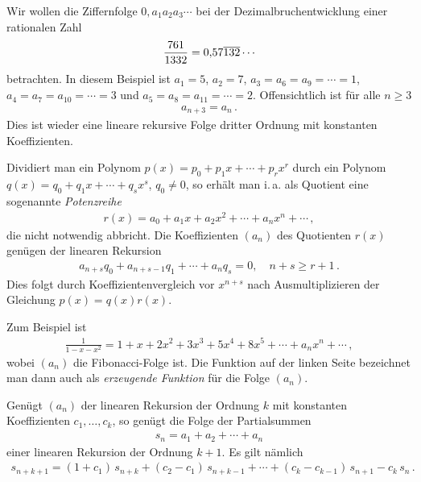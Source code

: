 \documentclass[11pt,a4paper]{article}
\begin{document}
\begin{beispiel}\label{b-dezimal}
Wir wollen die Ziffernfolge $0,a_1a_2a_3\cdots $ bei der
Dezimalbruchentwicklung einer rationalen Zahl
\begin{gather*}
  \frac{761}{1332}= 0{,}57\overline{132}\cdots 
\end{gather*}
betrachten.  In diesem Beispiel ist $a_1=5$, $a_2=7$, $a_3=a_6=a_9=\cdots =
1$, $a_4=a_7=a_{10}=\cdots = 3$ und $a_5=a_8=a_{11} =\cdots =2$. Offensichtlich
ist für alle $n\ge 3$
\begin{gather*}
  a_{n+3} = a_n\,.
\end{gather*}
Dies ist wieder eine lineare rekursive  Folge dritter Ordnung
mit konstanten Koeffizienten.
\end{beispiel}

\begin{beispiel}\label{b-polynom}
  Dividiert man ein Polynom $p(x)=p_0 +p_1 x +\cdots +p_r x^r $ durch ein
  Polynom $q(x)=q_0 +q_1 x+ \cdots + q_s x^s $, $q_0\ne 0$, so erhält man
  i.\,a. als Quotient eine sogenannte \emph{Potenzreihe}
  \begin{gather*}
    r(x)=a_0 +a_1 x +a_2 x^2 +\cdots +a_n x^n +\cdots\,,
  \end{gather*}
  die nicht notwendig abbricht. Die Koeffizienten $(a_n)$ des Quotienten $r(x)$
  genügen der linearen Rekursion
  \begin{gather*}
    a_{n+s} q_0 +a_{n+s-1} q_1 +\cdots + a_n q_{s} =0,\quad n+s\ge r+1\,.
  \end{gather*}
  Dies folgt durch Koeffizientenvergleich vor $x^{n+s}$ nach Ausmultiplizieren
  der Gleichung $p(x)=q(x)r(x)$.  

Zum Beispiel ist
\begin{gather*}
  \frac{1}{1-x-x^2}=1+x+2x^2 +3 x^3 +5x^4 +8 x^5 +\cdots +a_n x^n+ \cdots\,,
\end{gather*}
wobei $(a_n)$ die {\sc Fibonacci}-Folge ist. Die Funktion auf der linken Seite
bezeichnet man dann auch als \emph{erzeugende Funktion} für die Folge $(a_n)$.
\end{beispiel}

\begin{beispiel}\label{b-Reihe} 
Genügt $(a_n)$ der linearen Rekursion \rf[e-linrek] der Ordnung $k$ mit
konstanten Koeffizienten $c_1,\dots, c_k$, so genügt die Folge der
Partialsummen
\begin{gather*}
  s_n= a_1 +a_2 +\cdots +a_n
\end{gather*}
einer linearen Rekursion \rf[e-linrek] der Ordnung $k+1$. Es gilt nämlich
\begin{gather*}
  s_{n+k+1} =(1+c_1)\,s_{n+k} +(c_2 -c_1)\, s_{n+k-1} +\cdots + (c_k
  -c_{k-1})\,s_{n+1} -c_k\, s_n\,.
\end{gather*}
\end{beispiel}
\end{document}
